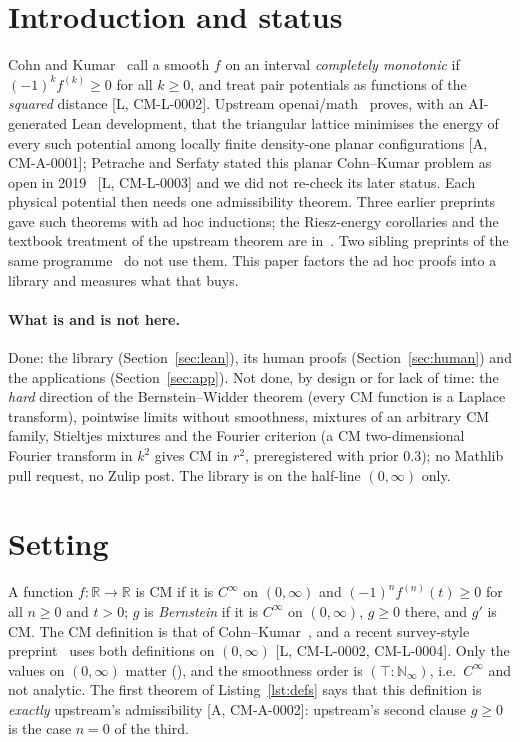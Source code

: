 \documentclass[10pt]{article}
\theoremstyle{remark}
\newcommand{\R}{\mathbb{R}}
\newcommand{\tier}[1]{\textsf{[#1]}}
\newcommand{\lean}[1]{\texttt{\detokenize{#1}}}
\newcommand{\CM}{\mathrm{CM}}
\begin{document}
\section{Introduction and status}\label{sec:intro}
Cohn and Kumar~\cite{ck} call a smooth $f$ on an interval \emph{completely monotonic} if $(-1)^kf^{(k)}\ge0$ for all
$k\ge0$, and treat pair potentials as functions of the \emph{squared} distance \tier{L, CM-L-0002}. Upstream
openai/math~\cite{oai} proves, with an AI-generated Lean development, that the triangular lattice minimises the energy of
every such potential among locally finite density-one planar configurations \tier{A, CM-A-0001}; Petrache and
Serfaty stated this planar Cohn--Kumar problem as open in 2019~\cite{ps} \tier{L, CM-L-0003} and we did not re-check its
later status. Each physical potential then needs one admissibility theorem. Three earlier preprints~\cite{dip,yuk,kel} gave
such theorems with ad hoc inductions; the Riesz-energy corollaries and the textbook treatment of the upstream theorem are in~\cite{d2,uot,txt}. Two sibling preprints of the same programme~\cite{sig,bog} do not use them. This paper factors the ad hoc proofs into a library and measures what that buys.

\paragraph{What is and is not here.} Done: the library (Section~\ref{sec:lean}), its human proofs
(Section~\ref{sec:human}) and the applications (Section~\ref{sec:app}). Not done, by design or for lack of time: the
\emph{hard} direction of the Bernstein--Widder theorem (every CM function is a Laplace transform), pointwise limits without
smoothness, mixtures of an arbitrary CM family, Stieltjes mixtures and the Fourier criterion (a CM two-dimensional
Fourier transform in $k^2$ gives CM in $r^2$, preregistered with prior 0.3); no Mathlib pull request, no Zulip post.
The library is on the half-line $(0,\infty)$ only.

\section{Setting}\label{sec:setting}

A function $f:\R\to\R$ is $\CM$ if it is $C^\infty$ on $(0,\infty)$ and $(-1)^nf^{(n)}(t)\ge0$ for all $n\ge0$ and
$t>0$; $g$ is \emph{Bernstein} if it is $C^\infty$ on $(0,\infty)$, $g\ge0$ there, and $g'$ is $\CM$. The CM definition is that of Cohn--Kumar~\cite{ck}, and a recent survey-style
preprint~\cite{sal} uses both definitions on $(0,\infty)$ \tier{L, CM-L-0002, CM-L-0004}. Only the values on $(0,\infty)$ matter
(\lean{congr}), and the smoothness order is $(\top:\mathbb N_\infty)$, i.e.\ $C^\infty$ and not analytic. The first
theorem of Listing~\ref{lst:defs} says that this definition is \emph{exactly} upstream's admissibility
\tier{A, CM-A-0002}: upstream's second clause $g\ge0$ is the case $n=0$ of the third.
\end{document}
